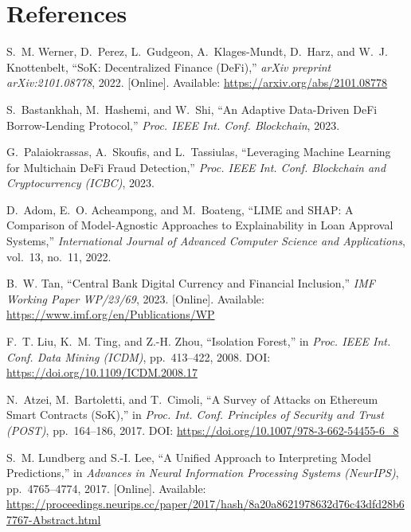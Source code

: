 \documentclass[12pt,a4paper]{report}
\begin{document}
\chapter*{References}
{}

{\small
\begin{enumerate}[label={[\arabic*]}]
\item S.~M. Werner, D.~Perez, L.~Gudgeon, A.~Klages-Mundt, D.~Harz, and W.~J. Knottenbelt, ``SoK: Decentralized Finance (DeFi),'' \textit{arXiv preprint arXiv:2101.08778}, 2022. [Online]. Available: \url{https://arxiv.org/abs/2101.08778}

\item S.~Bastankhah, M.~Hashemi, and W.~Shi, ``An Adaptive Data-Driven DeFi Borrow-Lending Protocol,'' \textit{Proc. IEEE Int. Conf. Blockchain}, 2023.

\item G.~Palaiokrassas, A.~Skoufis, and L.~Tassiulas, ``Leveraging Machine Learning for Multichain DeFi Fraud Detection,'' \textit{Proc. IEEE Int. Conf. Blockchain and Cryptocurrency (ICBC)}, 2023.

\item D.~Adom, E.~O. Acheampong, and M.~Boateng, ``LIME and SHAP: A Comparison of Model-Agnostic Approaches to Explainability in Loan Approval Systems,'' \textit{International Journal of Advanced Computer Science and Applications}, vol.~13, no.~11, 2022.

\item B.~W. Tan, ``Central Bank Digital Currency and Financial Inclusion,'' \textit{IMF Working Paper WP/23/69}, 2023. [Online]. Available: \url{https://www.imf.org/en/Publications/WP}

\item F.~T. Liu, K.~M. Ting, and Z.-H. Zhou, ``Isolation Forest,'' in \textit{Proc. IEEE Int. Conf. Data Mining (ICDM)}, pp.~413--422, 2008. DOI: \url{https://doi.org/10.1109/ICDM.2008.17}

\item N.~Atzei, M.~Bartoletti, and T.~Cimoli, ``A Survey of Attacks on Ethereum Smart Contracts (SoK),'' in \textit{Proc. Int. Conf. Principles of Security and Trust (POST)}, pp.~164--186, 2017. DOI: \url{https://doi.org/10.1007/978-3-662-54455-6_8}

\item S.~M. Lundberg and S.-I. Lee, ``A Unified Approach to Interpreting Model Predictions,'' in \textit{Advances in Neural Information Processing Systems (NeurIPS)}, pp.~4765--4774, 2017. [Online]. Available: \url{https://proceedings.neurips.cc/paper/2017/hash/8a20a8621978632d76c43dfd28b67767-Abstract.html}


\end{enumerate}}
\end{document}
